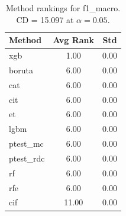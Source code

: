 \begin{table}[h]
\centering
\caption{Method rankings for f1_macro. CD = 15.097 at $\alpha=0.05$.}
\label{tab:ranks_f1_macro}
\begin{tabular}{lcc}
\toprule
Method & Avg Rank & Std \\
\midrule
xgb & 1.00 & 0.00 \\
boruta & 6.00 & 0.00 \\
cat & 6.00 & 0.00 \\
cit & 6.00 & 0.00 \\
et & 6.00 & 0.00 \\
lgbm & 6.00 & 0.00 \\
ptest_mc & 6.00 & 0.00 \\
ptest_rdc & 6.00 & 0.00 \\
rf & 6.00 & 0.00 \\
rfe & 6.00 & 0.00 \\
cif & 11.00 & 0.00 \\
\bottomrule
\end{tabular}
\end{table}